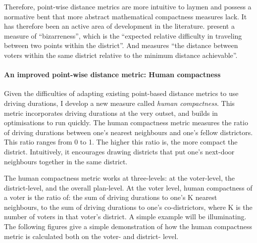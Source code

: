 \documentclass[]{article}
\let\oldparagraph\paragraph
\renewcommand{\paragraph}[1]{\oldparagraph{#1}\mbox{}}
\begin{document}
Therefore, point-wise distance metrics are more intuitive to laymen and
possess a normative bent that more abstract mathematical compactness
measures lack. It has therefore been an active area of development in
the literature. \cite{cm2010} present a measure of ``bizarreness'',
which is the ``expected relative difficulty in traveling between two
points within the district''. And \cite{fh2011} measures ``the distance
between voters within the same district relative to the minimum distance
achievable''.

\hypertarget{an-improved-point-wise-distance-metric-human-compactness}{%
\paragraph{An improved point-wise distance metric: Human
compactness}\label{an-improved-point-wise-distance-metric-human-compactness}}

Given the difficulties of adapting existing point-based distance metrics
to use driving durations, I develop a new measure called \emph{human
compactness}. This metric incorporates driving durations at the very
outset, and builds in optimisations to run quickly. The human
compactness metric measures the ratio of driving durations between one's
nearest neighbours and one's fellow districtors. This ratio ranges from
0 to 1. The higher this ratio is, the more compact the district.
Intuitively, it encourages drawing districts that put one's next-door
neighbours together in the same district.

The human compactness metric works at three-levels: at the voter-level,
the district-level, and the overall plan-level. At the voter level,
human compactness of a voter is the ratio of: the sum of driving
durations to one's K nearest neighbours, to the sum of driving durations
to one's co-districtors, where K is the number of voters in that voter's
district. A simple example will be illuminating. The following figures
give a simple demonstration of how the human compactness metric is
calculated both on the voter- and district- level.
\end{document}
